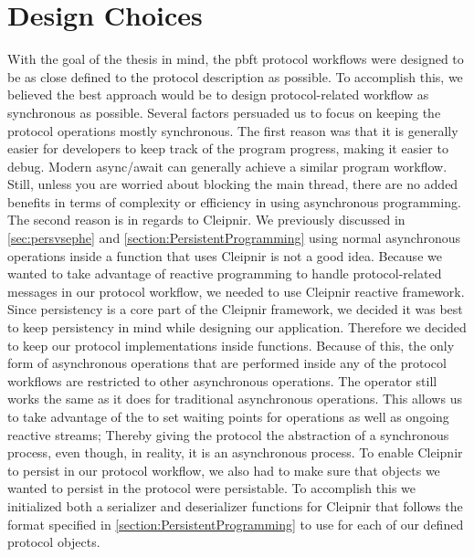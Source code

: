 \section{Design Choices}
With the goal of the thesis in mind, the \ac{pbft} protocol workflows were designed to be as close defined to the protocol description as possible. To accomplish this, we believed the best approach would be to design protocol-related workflow as synchronous as possible. Several factors persuaded us to focus on keeping the protocol operations mostly synchronous. The first reason was that it is generally easier for developers to keep track of the program progress, making it easier to debug. Modern async/await can generally achieve a similar program workflow. Still, unless you are worried about blocking the main thread, there are no added benefits in terms of complexity or efficiency in using asynchronous programming. The second reason is in regards to Cleipnir. We previously discussed in \autoref{sec:persvsephe} and \autoref{section:PersistentProgramming} using normal asynchronous operations inside a function that uses Cleipnir is not a good idea. Because we wanted to take advantage of reactive programming to handle protocol-related messages in our protocol workflow, we needed to use Cleipnir reactive framework. Since persistency is a core part of the Cleipnir framework, we decided it was best to keep persistency in mind while designing our application. Therefore we decided to keep our protocol implementations inside  functions. Because of this, the only form of asynchronous operations that are performed inside any of the protocol workflows are restricted to other  asynchronous operations. The  operator still works the same as it does for traditional asynchronous operations. This allows us to take advantage of the  to set waiting points for  operations as well as ongoing reactive streams; Thereby giving the protocol the abstraction of a synchronous process, even though, in reality, it is an asynchronous process. 
To enable Cleipnir to persist in our protocol workflow, we also had to make sure that objects we wanted to persist in the protocol were persistable. To accomplish this we initialized both a serializer and deserializer functions for Cleipnir that follows the format specified in \autoref{section:PersistentProgramming} to use for each of our defined protocol objects.  
